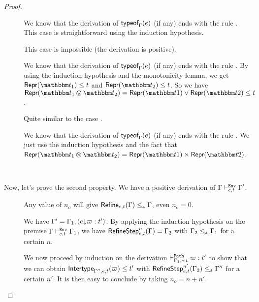 \documentclass[a4paper]{article}
\theoremstyle{definition}
\begin{document}
\begin{proof}
\begin{description}
    \item[] We know that the derivation of $\textsf{typeof}_{\Gamma}(e)$ (if any) ends with the rule .
    This case is straightforward using the induction hypothesis.
    \item[] This case is impossible (the derivation is positive).
    \item[] We know that the derivation of $\textsf{typeof}_{\Gamma}(e)$ (if any) ends with the rule .
    By using the induction hypothesis and the monotonicity lemma, we get $\tsrep{\ts_1}\leq t$ and $\tsrep{\ts_2}\leq t$.
    So we have $\tsrep{\ts_1\tsor\ts_2}=\tsrep{\ts1}\vee\tsrep{\ts2}\leq t$.
    \item[] Quite similar to the case .
    \item[] We know that the derivation of $\textsf{typeof}_{\Gamma}(e)$ (if any) ends with the rule .
    We just use the induction hypothesis and the fact that $\tsrep{\ts_1\tstimes\ts_2}=\pair {\tsrep{\ts1}} {\tsrep{\ts2}}$.
  \end{description}

  \ 

  Now, let's prove the second property. We have a positive derivation of $\Gamma \vdash^{\texttt{Env}}_{e,t} \Gamma'$.

  \begin{description}
    \item[] Any value of $n_o$ will give $\textsf{Refine}_{e,t}(\Gamma) \leq_{\!\scriptscriptstyle\mathcal{A}} \Gamma$, even $n_o = 0$.
    \item[] We have $\Gamma' = \Gamma_1,(e{\downarrow}\varpi:t')$.
    By applying the induction hypothesis on the premise $\Gamma \vdash^{\texttt{Env}}_{e,t} \Gamma_1$, we have
    $\textsf{RefineStep}_{e,t}^n (\Gamma) = \Gamma_2$ with $\Gamma_2 \leq_{\!\scriptscriptstyle\mathcal{A}} \Gamma_1$ for a certain $n$.

    We now proceed by induction on the derivation $\vdash^{\texttt{Path}}_{\Gamma_1,e,t} \varpi:t'$
    to show that we can obtain $\textsf{Intertype}_{\Gamma'',e,t} (\varpi) \leq t'$ with $\textsf{RefineStep}_{e,t}^{n'} (\Gamma_2) \leq_{\!\scriptscriptstyle\mathcal{A}} \Gamma''$
    for a certain $n'$. It is then easy to conclude by taking $n_o = n+n'$.


\end{description}
\end{proof}
\end{document}
